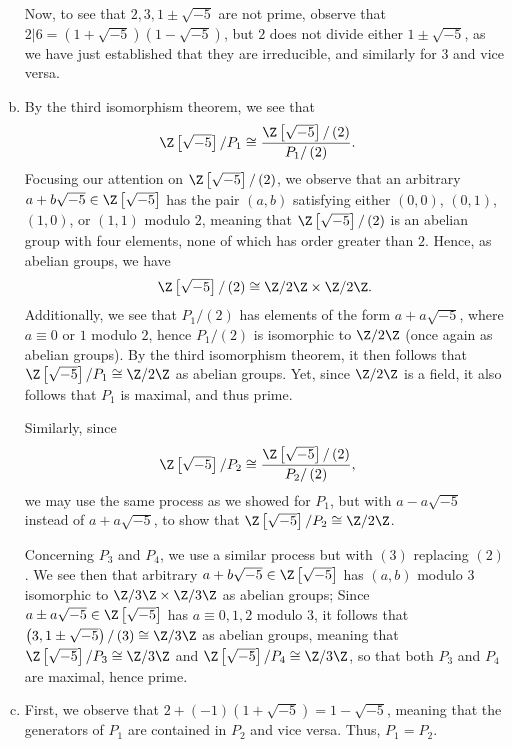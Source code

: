 \documentclass[10pt]{mypackage}
\begin{document}
\begin{solution}
\begin{enumerate}[(a)]
      Now, to see that $2, 3, 1\pm\sqrt{-5}$ are not prime, observe that $2 | 6 = \left( 1+\sqrt{-5} \right)\left( 1-\sqrt{-5} \right)$, but $2$ does not divide either $1\pm\sqrt{-5}$, as we have just established that they are irreducible, and similarly for $3$ and vice versa.
    \item By the third isomorphism theorem, we see that
      \begin{align*}
        \Z\left[ \sqrt{-5} \right]/P_1 &\cong \frac{\Z\left[ \sqrt{-5} \right]/\left( 2 \right)}{ P_1/\left( 2 \right) }.
      \end{align*}
      Focusing our attention on $ \Z\left[ \sqrt{-5} \right]/\left( 2 \right) $, we observe that an arbitrary $a + b\sqrt{-5}\in \Z\left[ \sqrt{-5} \right]$ has the pair $\left( a,b \right)$ satisfying either $\left( 0,0 \right)$, $\left( 0,1 \right)$, $\left( 1,0 \right)$, or $\left( 1,1 \right)$ modulo $2$, meaning that $\Z\left[ \sqrt{-5} \right]/\left( 2 \right)$ is an abelian group with four elements, none of which has order greater than $2$. Hence, as abelian groups, we have
      \begin{align*}
        \Z\left[ \sqrt{-5} \right]/\left( 2 \right)\cong \Z/2\Z\times \Z/2\Z.
      \end{align*}
      Additionally, we see that $P_1/\left( 2 \right)$ has elements of the form $a + a\sqrt{-5}$, where $a\equiv 0$ or $1$ modulo $2$, hence $P_1/\left( 2 \right)$ is isomorphic to $\Z/2\Z$ (once again as abelian groups). By the third isomorphism theorem, it then follows that $\Z\left[ \sqrt{-5} \right]/P_1\cong \Z/2\Z$ as abelian groups. Yet, since $\Z/2\Z$ is a field, it also follows that $P_1$ is maximal, and thus prime.\newline

      Similarly, since
      \begin{align*}
        \Z\left[ \sqrt{-5} \right]/P_2 &\cong \frac{\Z\left[ \sqrt{-5} \right]/\left( 2 \right)}{ P_2/\left( 2 \right) },
      \end{align*}
      we may use the same process as we showed for $P_1$, but with $a-a\sqrt{-5}$ instead of $a+a\sqrt{-5}$, to show that $\Z\left[ \sqrt{-5} \right]/P_2\cong \Z/2\Z$.\newline

      Concerning $P_3$ and $P_4$, we use a similar process but with $\left( 3 \right)$ replacing $\left( 2 \right)$. We see then that arbitrary $a + b\sqrt{-5}\in \Z\left[ \sqrt{-5} \right]$ has $\left( a,b \right)$ modulo $3$ isomorphic to $\Z/3\Z\times \Z/3\Z$ as abelian groups; Since $a \pm a\sqrt{-5}\in \Z\left[ \sqrt{-5} \right]$ has $a\equiv 0,1,2$ modulo $3$, it follows that $\left( 3, 1 \pm \sqrt{-5} \right)/\left( 3 \right)\cong \Z/3\Z$ as abelian groups, meaning that $\Z\left[ \sqrt{-5} \right]/P_3\cong \Z/3\Z$ and $\Z\left[ \sqrt{-5} \right]/P_4\cong \Z/3\Z$, so that both $P_3$ and $P_4$ are maximal, hence prime.
    \item First, we observe that $2 + \left( -1 \right)\left( 1+\sqrt{-5} \right)= 1-\sqrt{-5}$, meaning that the generators of $P_1$ are contained in $P_2$ and vice versa. Thus, $P_1 = P_2$.\newline


\end{enumerate}
\end{solution}
\end{document}
